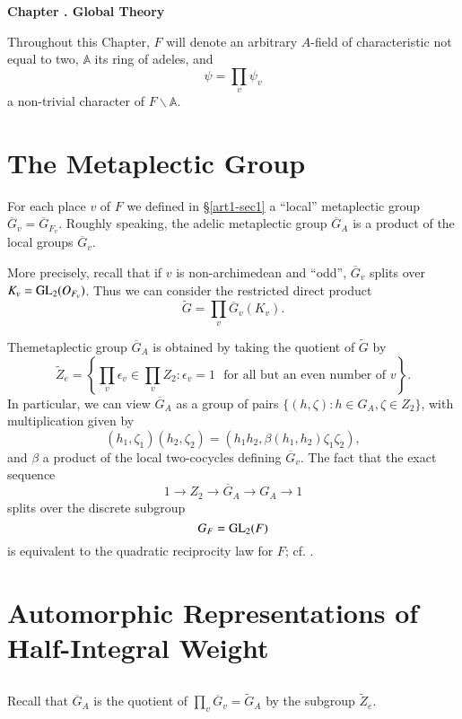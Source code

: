 \bigskip
\begin{center}
{\large\bfseries Chapter .\label{art1-chap-II} Global Theory}
\end{center}
\smallskip

Throughout this Chapter, $F$ will denote an arbitrary $A$-field of characteristic not equal to two, $\mathbb{A}$ its ring of adeles, and
$$
\psi=\prod\limits_{v}\psi_{v}
$$
a non-trivial character of $F\backslash \mathbb{A}$.

\section{The Metaplectic Group}\label{art1-sec8}

For each place $v$ of $F$ we defined in \S\ref{art1-sec1} a ``local'' metaplectic group $\overline{G}_{v}=\overline{G}_{F_{v}}$. Roughly speaking, the adelic metaplectic group $\overline{G}_{A}$ is a product of the local groups $\overline{G}_{v}$.

More precisely, recall that if $v$ is non-archimedean and ``odd'', $\overline{G}_{v}$ splits over $K_{v}=\mathrm{GL}_{2}(O_{F_{v}})$. Thus we can consider the restricted direct product
$$
\widetilde{G}=\prod\limits_{v}\overline{G}_{v}(K_{v}).
$$

The\pageoriginale metaplectic group $\overline{G}_{A}$ is obtained by taking the quotient of $\widetilde{G}$ by
$$
\widetilde{Z}_{e}=\left\{\prod\limits_{v}\epsilon_{v}\in \prod\limits_{v}Z_{2}:\epsilon_{v}=1\text{~ for all but an even number of } v\right\}.
$$
In particular, we can view $\overline{G}_{A}$ as a group of pairs $\{(h,\zeta):h\in G_{A},\zeta\in Z_{2}\}$, with multiplication given by
$$
(h_{1},\zeta_{1})(h_{2},\zeta_{2})=(h_{1}h_{2},\beta(h_{1},h_{2})\zeta_{1}\zeta_{2}),
$$
and $\beta$ a product of the local two-cocycles defining $\overline{G}_{v}$. The fact that the exact sequence
$$
1\to Z_{2}\to \overline{G}_{A}\to G_{A}\to 1
$$
splits over the discrete subgroup
$$
G_{F}=\mathrm{GL}_{2}(F)
$$
is equivalent to the quadratic reciprocity law for $F$; cf. \cite{Weil}.

\section{Automorphic Representations of Half-Integral Weight}\label{art1-sec9}

\subsection{}\label{art1-sec9.1}
Recall that $\overline{G}_{A}$ is the quotient of $\prod\limits_{v}\overline{G}_{v}=\widetilde{G}_{A}$ by the subgroup $\widetilde{Z}_{e}$.

